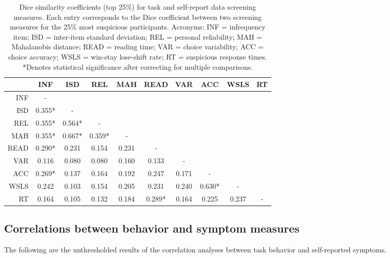 \documentclass[a4paper,notitlepage,12pt]{article}
\begin{document}
\begin{refsection}[supp]
\begin{table}[H]
\centering
\small
\begin{tabular}{rccccccccc}
\toprule
{} &     INF &     ISD &     REL &    MAH &    READ &    VAR &     ACC &   WSLS & RT \\
\midrule
INF  &       - &         &         &        &         &        &         &        &    \\
ISD  &  0.355* &       - &         &        &         &        &         &        &    \\
REL  &  0.355* &  0.564* &       - &        &         &        &         &        &    \\
MAH  &  0.355* &  0.667* &  0.359* &      - &         &        &         &        &    \\
READ &  0.290* &   0.231 &   0.154 &  0.231 &       - &        &         &        &    \\
VAR  &   0.116 &   0.080 &   0.080 &  0.160 &   0.133 &      - &         &        &    \\
ACC  &  0.269* &   0.137 &   0.164 &  0.192 &   0.247 &  0.171 &       - &        &    \\
WSLS &   0.242 &   0.103 &   0.154 &  0.205 &   0.231 &  0.240 &  0.630* &      - &    \\
RT   &   0.164 &   0.105 &   0.132 &  0.184 &  0.289* &  0.164 &   0.225 &  0.237 &  - \\
\bottomrule
\end{tabular}
\captionsetup{width=0.88\textwidth}
\caption{Dice similarity coefficients (top 25\%) for task and self-report data screening measures. Each entry corresponds to the Dice coefficient between two screening measures for the 25\% most suspicious participants. Acronyms: INF = infrequency item; ISD = inter-item standard deviation; REL = personal reliability; MAH = Mahalanobis distance; READ = reading time; VAR = choice variability; ACC = choice accuracy; WSLS = win-stay lose-shift rate; RT = suspicious response times. *Denotes statistical significance after correcting for multiple comparisons.}
\end{table}

\subsection*{Correlations between behavior and symptom measures}

The following are the unthresholded results of the correlation analyses between task behavior and self-reported symptoms.  


\end{refsection}
\end{document}

